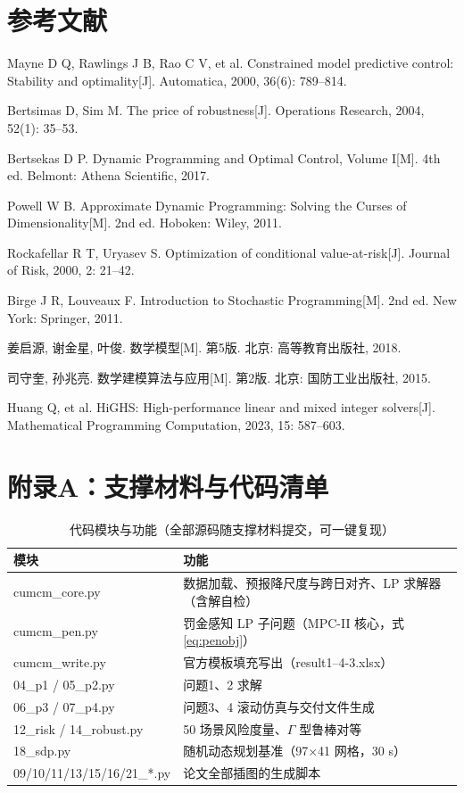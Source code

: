 \documentclass[11pt,a4paper]{ctexart}
\begin{document}
\section*{参考文献}
\begin{enumerate}[label={[\arabic*]}]
  \item Mayne D Q, Rawlings J B, Rao C V, et al. Constrained model predictive control: Stability and optimality[J]. Automatica, 2000, 36(6): 789--814.
  \item Bertsimas D, Sim M. The price of robustness[J]. Operations Research, 2004, 52(1): 35--53.
  \item Bertsekas D P. Dynamic Programming and Optimal Control, Volume I[M]. 4th ed. Belmont: Athena Scientific, 2017.
  \item Powell W B. Approximate Dynamic Programming: Solving the Curses of Dimensionality[M]. 2nd ed. Hoboken: Wiley, 2011.
  \item Rockafellar R T, Uryasev S. Optimization of conditional value-at-risk[J]. Journal of Risk, 2000, 2: 21--42.
  \item Birge J R, Louveaux F. Introduction to Stochastic Programming[M]. 2nd ed. New York: Springer, 2011.
  \item 姜启源, 谢金星, 叶俊. 数学模型[M]. 第5版. 北京: 高等教育出版社, 2018.
  \item 司守奎, 孙兆亮. 数学建模算法与应用[M]. 第2版. 北京: 国防工业出版社, 2015.
  \item Huang Q, et al. HiGHS: High-performance linear and mixed integer solvers[J]. Mathematical Programming Computation, 2023, 15: 587--603.
\end{enumerate}

\newpage
\appendix
\section{附录A：支撑材料与代码清单}
\begin{table}[H]\centering\small
\caption{代码模块与功能（全部源码随支撑材料提交，可一键复现）}
\begin{tabular}{ll}
\toprule
模块 & 功能\\
\midrule
cumcm\_core.py & 数据加载、预报降尺度与跨日对齐、LP 求解器（含解自检）\\
cumcm\_pen.py & 罚金感知 LP 子问题（MPC-II 核心，式 \eqref{eq:penobj}）\\
cumcm\_write.py & 官方模板填充写出（result1--4-3.xlsx）\\
04\_p1 / 05\_p2.py & 问题1、2 求解\\
06\_p3 / 07\_p4.py & 问题3、4 滚动仿真与交付文件生成\\
12\_risk / 14\_robust.py & 50 场景风险度量、$\Gamma$ 型鲁棒对等\\
18\_sdp.py & 随机动态规划基准（97$\times$41 网格，30 s）\\
09/10/11/13/15/16/21\_*.py & 论文全部插图的生成脚本\\
\bottomrule
\end{tabular}
\end{table}
\end{document}
